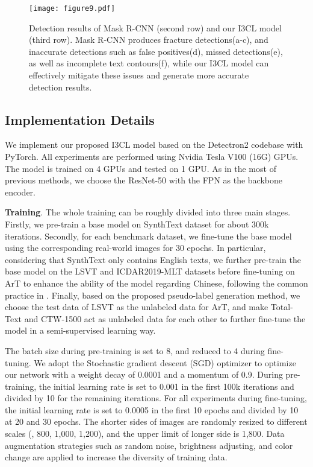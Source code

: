  \begin{figure*}[ht]
  \centering
  \texttt{[image: figure9.pdf]}
  \caption{Detection results of Mask R-CNN (second row) and our I3CL model (third row). Mask R-CNN produces fracture detections(a-c), and inaccurate detections such as false positives(d), missed detections(e), as well as incomplete text contours(f), while our I3CL model can effectively mitigate these issues and generate more accurate detection results.}
  \label{fig9}
\end{figure*}


\subsection{Implementation Details}
We implement our proposed I3CL model based on the Detectron2 codebase with PyTorch. All experiments are performed using Nvidia Tesla V100 (16G) GPUs. The model is trained on 4 GPUs and tested on 1 GPU. As in the most of previous methods, we choose the ResNet-50 with the FPN as the backbone encoder.

\textbf{Training}. The whole training can be roughly divided into three main stages. Firstly, we pre-train a base model on SynthText dataset for about 300k iterations. Secondly, for each benchmark dataset, we fine-tune the base model using the corresponding real-world images for 30 epochs. In particular, considering that SynthText only contains English texts, we further pre-train the base model on the LSVT \citep{lsvt} and ICDAR2019-MLT \citep{icdar2019mlt} datasets before fine-tuning on ArT  to enhance the ability of the model regarding Chinese, following the common practice in \citep{crafts}. Finally, based on the proposed pseudo-label generation method, we choose the test data of LSVT as the unlabeled data for ArT, and make Total-Text and CTW-1500 act as unlabeled data for each other to further fine-tune the model in a semi-supervised learning way.

The batch size during pre-training is set to 8, and reduced to 4 during fine-tuning. We adopt the Stochastic gradient descent (SGD) optimizer to optimize our network with a weight decay of 0.0001 and a momentum of 0.9. During pre-training, the initial learning rate is set to 0.001 in the first 100k iterations and divided by 10 for the remaining iterations. For all experiments during fine-tuning, the initial learning rate is set to 0.0005 in the first 10 epochs and divided by 10 at 20 and 30 epochs. The shorter sides of images are randomly resized to different scales (, 800, 1,000, 1,200), and the upper limit of longer side is 1,800. Data augmentation strategies such as random noise, brightness adjusting, and color change are applied to increase the diversity of training data.

